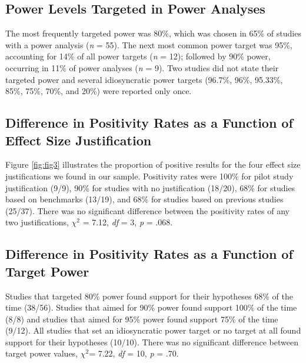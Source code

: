 \documentclass[
  doc, donotrepeattitle,floatsintext]{apa7}
\begin{document}
\pagebreak

\hypertarget{power-levels-targeted-in-power-analyses}{%
\subsection{Power Levels Targeted in Power Analyses}\label{power-levels-targeted-in-power-analyses}}

The most frequently targeted power was 80\%, which was chosen in 65\% of studies with a power analysis (\emph{n} = 55). The next most common power target was 95\%, accounting for 14\% of all power targets (\emph{n} = 12); followed by 90\% power, occurring in 11\% of power analyses (\emph{n} = 9). Two studies did not state their targeted power and several idiosyncratic power targets (96.7\%, 96\%, 95.33\%, 85\%, 75\%, 70\%, and 20\%) were reported only once.

\hypertarget{difference-in-positivity-rates-as-a-function-of-effect-size-justification}{%
\subsection{Difference in Positivity Rates as a Function of Effect Size Justification}\label{difference-in-positivity-rates-as-a-function-of-effect-size-justification}}

Figure \ref{fig:fig3} illustrates the proportion of positive results for the four effect size justifications we found in our sample. Positivity rates were 100\% for pilot study justification (9/9), 90\% for studies with no justification (18/20), 68\% for studies based on benchmarks (13/19), and 68\% for studies based on previous studies (25/37). There was no significant difference between the positivity rates of any two justifications, \(\chi^2\) = 7.12, \emph{df} = 3, \emph{p} = .068.

\hypertarget{difference-in-positivity-rates-as-a-function-of-target-power}{%
\subsection{Difference in Positivity Rates as a Function of Target Power}\label{difference-in-positivity-rates-as-a-function-of-target-power}}

Studies that targeted 80\% power found support for their hypotheses 68\% of the time (38/56). Studies that aimed for 90\% power found support 100\% of the time (8/8) and studies that aimed for 95\% power found support 75\% of the time (9/12). All studies that set an idiosyncratic power target or no target at all found support for their hypotheses (10/10). There was no significant difference between target power values, \(\chi^2\)= 7.22, \emph{df} = 10, \emph{p} = .70.
\end{document}
